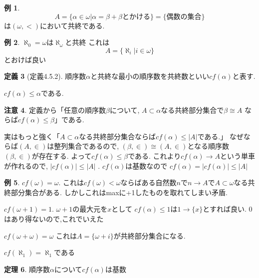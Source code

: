\documentclass[dvipdfmx,a4paper,11pt]{report}
\theoremstyle{definition}
\newtheorem{thm}{定理}
\newtheorem{dfn}[thm]{定義}
\newtheorem{rem}[thm]{注意}
\newtheorem{exa}[thm]{例}
\begin{document}
\begin{exa}
$$
A = \{ \alpha \in  \omega | \alpha = \beta + \beta\text{とかける}\}
=\{ \text{偶数の集合}\}
$$
は$(\omega, <)$において共終である. 
\end{exa}

\begin{exa}
$\aleph_0 = \omega$は$\aleph_{\omega}$と共終
これは
$$
A = \{\aleph_i | i \in \omega \}
$$
とおけば良い 
\end{exa}

 \begin{tcolorbox}
 [colback = white, colframe = green!35!black, fonttitle = \bfseries,breakable = true]
\begin{dfn}[定義4.5.2]
順序数$\alpha$と共終な最小の順序数を共終数といい$cf(\alpha)$と表す. 
\end{dfn}
\end{tcolorbox}
$cf(\alpha)\le \alpha$である. 

\begin{rem}
定義から「任意の順序数$\beta$について, $A \subset \alpha$なる共終部分集合で$\beta \cong A$
ならば$cf(\alpha) \le \beta$」である. 

実はもっと強く「$A \subset \alpha$なる共終部分集合ならば$cf(\alpha) \le |A|$である.」
なぜならば$(A, \in)$は整列集合であるので, $(\beta, \in) \cong (A, \in)$となる順序数$(\beta, \in)$が存在する.
よって$cf(\alpha) \le \beta$である.
これより$cf(\alpha)\to A$という単車が作れるので, $|cf(\alpha)| \le |A|$ . $cf(\alpha)$は基数なので
$cf(\alpha) = |cf(\alpha)| \le |A|$
\end{rem}

\begin{exa}
$cf(\omega) = \omega$.
これは$cf(\omega) < \omega$ならばある自然数$n$で$n \to A$で$A \subset \omega$なる共終部分集合がある. しかしこれはmaxに+1したものを取れてしまい矛盾.

$cf(\omega +1) = 1$. $\omega +1$の最大元を$x$として
$cf(\alpha) \le 1$は$1 \to \{ x\}$とすれば良い. 0はあり得ないので,これでいえた

$cf(\omega +\omega)=\omega$
これは$A = \{ \omega +i\}$が共終部分集合になる. 

$cf(\aleph_1)=\aleph_1$である
\end{exa}

 \begin{tcolorbox}
 [colback = white, colframe = green!35!black, fonttitle = \bfseries,breakable = true]
\begin{thm}
順序数$\alpha$について$cf(\alpha)$は基数
\end{thm}
\end{tcolorbox}
\end{document}
